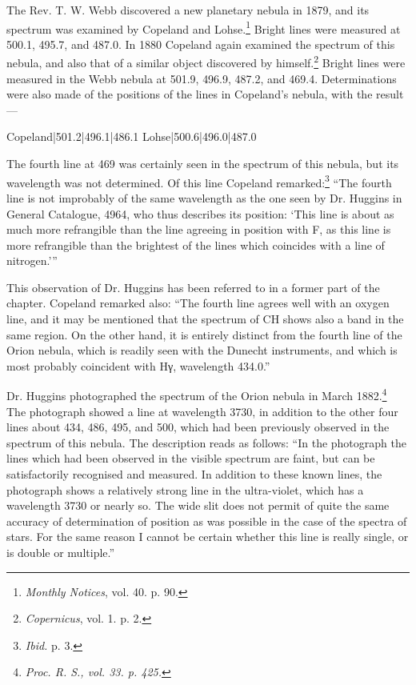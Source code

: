 \documentclass[a4paper, 12pt, oneside, polutonikogreek, english]{article}
\begin{document}
The Rev. T. W. Webb discovered a new planetary nebula in 1879, and its spectrum was examined by Copeland and Lohse.\footnote{\emph{Monthly Notices}, vol. 40. p. 90.} Bright lines were measured at 500.1, 495.7, and 487.0. In 1880 Copeland again examined the spectrum of this nebula, and also that of a similar object discovered by himself.\footnote{\emph{Copernicus}, vol. 1. p. 2.} Bright lines were measured in the Webb nebula at 501.9, 496.9, 487.2, and 469.4. Determinations were also made of the positions of the lines in Copeland's nebula, with the result ---

Copeland|501.2|496.1|486.1 
Lohse|500.6|496.0|487.0

The fourth line at 469 was certainly seen in the spectrum of this nebula, but its wavelength was not determined. Of this line Copeland remarked:\footnote{\emph{Ibid.} p. 3.} ``The fourth line is not improbably of the same wavelength as the one seen by Dr. Huggins in General Catalogue, 4964, who thus describes its position: `This line is about as much more refrangible than the line agreeing in position with F, as this line is more refrangible than the brightest of the lines which coincides with a line of nitrogen.'''

This observation of Dr. Huggins has been referred to in a former part of the chapter. Copeland remarked also: ``The fourth line agrees well with an oxygen line, and it may be mentioned that the spectrum of CH shows also a band in the same region. On the other hand, it is entirely distinct from the fourth line of the Orion nebula, which is readily seen with the Dunecht instruments, and which is most probably coincident with Hγ, wavelength 434.0.''

Dr. Huggins photographed the spectrum of the Orion nebula in March 1882.\footnote{\emph{Proc. R. S., vol. 33. p. 425.}} The photograph showed a line at wavelength 3730, in addition to the other four lines about 434, 486, 495, and 500, which had been previously observed in the spectrum of this nebula. The description reads as follows: ``In the photograph the lines which had been observed in the visible spectrum are faint, but can be satisfactorily recognised and measured. In addition to these known lines, the photograph shows a relatively strong line in the ultra-violet, which has a wavelength 3730 or nearly so. The wide slit does not permit of quite the same accuracy of determination of position as was possible in the case of the spectra of stars. For the same reason I cannot be certain whether this line is really single, or is double or multiple.''
\end{document}
